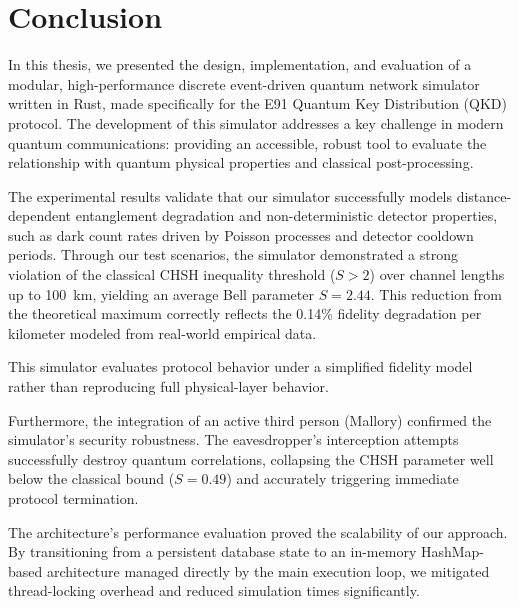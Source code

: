 \section{Conclusion}\label{s:conclusion}

In this thesis, we presented the design, implementation, and evaluation of a modular, high-performance discrete event-driven quantum network simulator written in Rust, made specifically for the E91 Quantum Key Distribution (QKD) protocol. The development of this simulator addresses a key challenge in modern quantum communications: providing an accessible, robust tool to evaluate the relationship with quantum physical properties and classical post-processing.

The experimental results validate that our simulator successfully models distance-dependent entanglement degradation and non-deterministic detector properties, such as dark count rates driven by Poisson processes and detector cooldown periods. Through our test scenarios, the simulator demonstrated a strong violation of the classical CHSH inequality threshold ($S > 2$) over channel lengths up to 100~km, yielding an average Bell parameter $S = 2.44$. This reduction from the theoretical maximum correctly reflects the 0.14\% fidelity degradation per kilometer modeled from real-world empirical data. 

This simulator evaluates protocol behavior under a simplified fidelity model rather than reproducing full physical-layer behavior.

Furthermore, the integration of an active third person (Mallory) confirmed the simulator's security robustness. The eavesdropper's interception attempts successfully destroy quantum correlations, collapsing the CHSH parameter well below the classical bound ($S = 0.49$) and accurately triggering immediate protocol termination.

The architecture’s performance evaluation proved the scalability of our approach. By transitioning from a persistent database state to an in-memory HashMap-based architecture managed directly by the main execution loop, we mitigated thread-locking overhead and reduced simulation times significantly.

